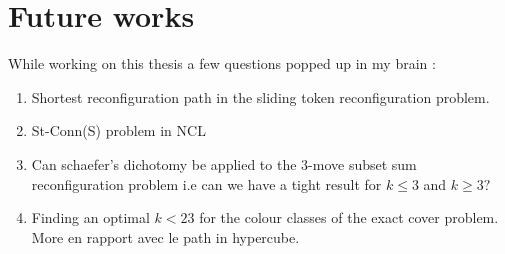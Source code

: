\chapter{Future works}

While working on this thesis a few questions popped up in my brain :
\begin{enumerate}
    \item Shortest reconfiguration path in the sliding token reconfiguration problem.
    \item St-Conn(S) problem in NCL
    \item Can schaefer's dichotomy be applied to the 3-move subset sum reconfiguration problem i.e can we have a tight result for $k \leq 3$
    and $k \geq 3 ? $
    \item Finding an optimal $k < 23$ for the colour classes of the exact cover problem. More en rapport avec le path in hypercube.
\end{enumerate}